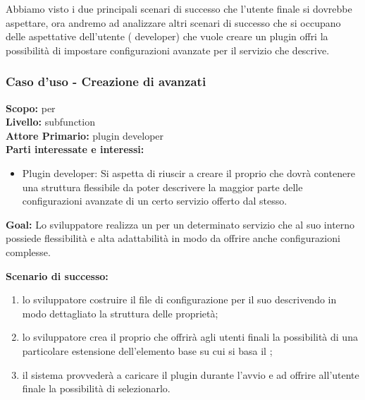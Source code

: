 \begin{flushleft}
\begin{boxedminipage}{\textwidth}
\end{boxedminipage}
\end{flushleft}
Abbiamo visto i due principali scenari di successo che l'utente finale si dovrebbe aspettare, ora andremo ad analizzare altri scenari di successo che si occupano delle aspettative dell'utente (\plugin{} developer) che vuole creare un plugin offri la possibilità di impostare configurazioni avanzate per il servizio che descrive.

\begin{flushleft}
\begin{boxedminipage}{\textwidth}

\subsubsection*{Caso d'uso - Creazione di \plugin{} avanzati}

\textbf{Scopo:} \plugin{} per \visualnetkit{} \\
\textbf{Livello:} subfunction \\
\textbf{Attore Primario:} plugin developer \\
\textbf{Parti interessate e interessi:}
\begin{itemize}
\item Plugin developer: Si aspetta di riuscir a creare il proprio \plugin{} che dovrà contenere una struttura flessibile da poter descrivere la maggior parte delle configurazioni avanzate di un certo servizio offerto dal \plugin{} stesso.
\end{itemize}

\textbf{Goal:} Lo sviluppatore realizza un \plugin{} per un determinato servizio che al suo interno possiede flessibilità e alta adattabilità in modo da offrire anche configurazioni complesse.

\textbf{Scenario di successo:}
\begin{enumerate}
\item lo sviluppatore costruire il file di configurazione per il suo \plugin{} descrivendo in modo dettagliato la struttura delle proprietà;
\item lo sviluppatore crea il proprio \plugin{} che offrirà agli utenti finali la possibilità di una particolare estensione dell'elemento base su cui si basa il \plugin{};
\item il sistema provvederà a caricare il plugin durante l'avvio e ad offrire all'utente finale la possibilità di selezionarlo.
\end{enumerate}

\end{boxedminipage}
\end{flushleft}

